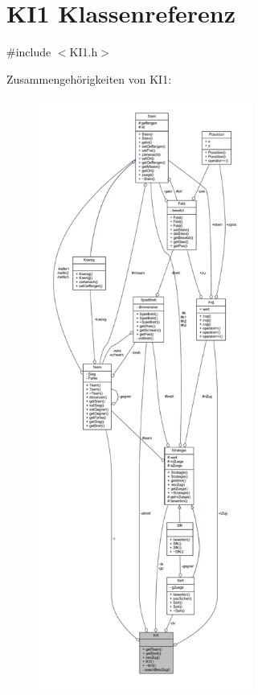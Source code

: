 \hypertarget{class_k_i1}{}\section{K\+I1 Klassenreferenz}
\label{class_k_i1}


{\ttfamily \#include $<$K\+I1.\+h$>$}



Zusammengehörigkeiten von K\+I1\+:\nopagebreak
\begin{figure}[H]
\begin{center}
\leavevmode
\includegraphics[height=550pt]{class_k_i1__coll__graph}
\end{center}
\end{figure}
